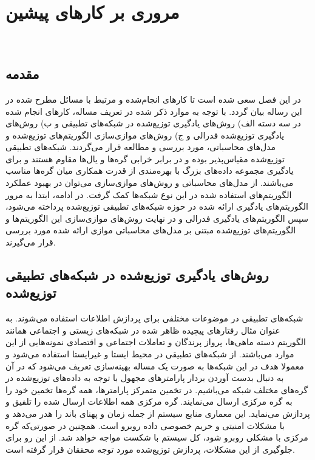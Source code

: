 \chapter{مروری بر کارهای پیشین}
\newpage
‎\renewcommand{\baselinestretch}{2}\normalsize‎
\label{Previous works}
\section{مقدمه}
در این فصل سعی شده است تا کارهای انجام‌شده و مرتبط با مسائل مطرح شده در این رساله بیان گردد. با توجه به موارد ذکر شده در تعریف مساله، کارهای انجام شده در سه دسته الف) روش‌های یادگیری توزیع‌شده در شبکه‌های تطبیقی و ب) روش‌های یادگیری توزیع‌شده فدرالی و ج) روش‌های موازی‌سازی‌ الگوریتم‌های توزیع‌شده و مدل‌های محاسباتی، مورد بررسی و مطالعه قرار می‌گردند. شبکه‌های تطبیقی توزیع‌شده مقیاس‌پذیر بوده و در برابر خرابی گره‌ها و یال‌ها مقاوم هستند و برای یادگیری مجموعه داده‌های بزرگ با بهره‌مندی از قدرت همکاری میان گره‌ها مناسب می‌باشند. از مدل‌های محاسباتی و روش‌های موازی‌سازی می‌توان در بهبود عملکرد الگوریتم‌های استفاده شده در این نوع شبکه‌ها کمک گرفت. در ادامه، ابتدا به مرور الگوریتم‌های یادگیری ارائه شده در حوزه شبکه‌های تطبیقی توزیع‌شده پرداخته می‌شود، سپس الگوریتم‌های یادگیری فدرالی و در نهایت روش‌های موازی‌سازی  این الگوریتم‌ها و الگوریتم‌های توزیع‌شده مبتنی بر مدل‌های محاسباتی موازی ارائه شده مورد بررسی قرار می‌گیرند.

\section{روش‌های یادگیری توزیع‌شده در شبکه‌های تطبیقی توزیع‌شده}
شبکه‌های تطبیقی در موضوعات مختلفی برای پردازش اطلاعات استفاده می‌شوند. به عنوان مثال رفتارهای پیچیده ظاهر شده در شبکه‌های زیستی و اجتماعی همانند الگوریتم دسته ماهی‌ها، پرواز پرندگان و تعاملات اجتماعی و اقتصادی نمونه‌هایی از این موارد می‌باشند. از شبکه‌های تطبیقی در محیط ایستا و غیرایستا استفاده می‌شود و معمولا هدف در این شبکه‌ها به صورت یک مساله بهینه‌سازی تعریف می‌شود که در آن به دنبال بدست آوردن بردار پارامترهای مجهول با توجه به داده‌های توزیع‌شده در گره‌های مختلف شبکه می‌باشیم. در تخمین متمرکز پارامترها، همه گره‌ها تخمین خود را به گره مرکزی ارسال می‌نمایند. گره مرکزی همه اطلاعات ارسال شده را تلفیق و پردازش می‌نماید. این معماری منابع سیستم از جمله زمان و پهنای باند را هدر می‌دهد و با مشکلات امنیتی و حریم خصوصی داده روبرو است. همچنین در صورتی‌که گره مرکزی با مشکلی روبرو شود، کل سیستم با شکست مواجه خواهد شد. از این رو برای جلوگیری از این مشکلات، پردازش توزیع‌شده مورد توجه محققان قرار گرفته است. 

